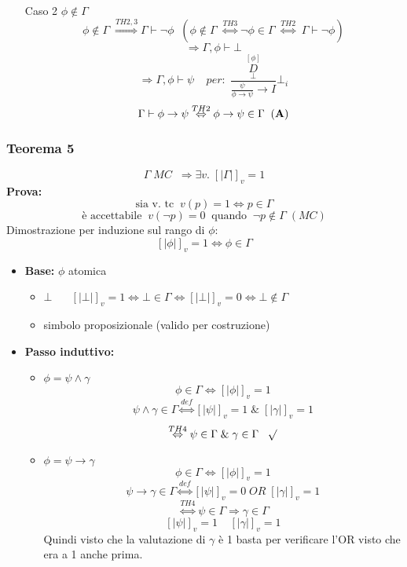 \documentclass{article}
\theoremstyle{break}
\theoremstyle{break}
\theoremstyle{break}
\theoremstyle{break}
\begin{document}
\begin{itemize}
\begin{enumerate}
\begin{enumerate}
          \item [Caso 2] \( \phi \notin \Gamma \) 
            \[
              \phi \notin \Gamma \; \stackrel{TH2,3}{\Rightarrow} \Gamma \vdash \neg \phi\;\; (\phi \notin \Gamma\; \stackrel{TH3}{\Leftrightarrow} \neg \phi \in \Gamma\; \stackrel{TH2}{\Leftrightarrow}\; \Gamma \vdash \neg \phi)
            \]
            \[
            \Rightarrow \Gamma, \phi \vdash \bot
            \] 
            \[
              \Rightarrow \Gamma, \phi \vdash \psi\;\;\;\;per:\; \frac{\underset{\bot}{\stackrel{[\phi]}{D}}}{\frac{\psi}{\phi \to \psi}\to I}\bot_i
            \] 
            \[
              \Gamma \vdash \phi \to \psi \stackrel{TH2}{\Leftrightarrow} \phi \to \psi \in \Gamma\;\;(\text{\textbf{A}})
            \] 
        \end{enumerate}
    \end{enumerate}
\end{itemize}
\subsubsection{Teorema 5}
\[
  \Gamma\;MC\;\; \Rightarrow \exists v.\; [|\Gamma|]_v=1
\] 
\textbf{Prova:}
\[
\text{sia v. tc}\;\; v(p)=1 \Leftrightarrow p \in \Gamma
\] 
\[
\text{è accettabile}\;\;v(\neg p) = 0 \;\;\text{quando}\;\; \neg p \notin \Gamma\;(MC)
\] 
Dimostrazione per induzione sul rango di \( \phi \):
\[
  [|\phi|]_v = 1 \Leftrightarrow \phi \in \Gamma
\] 
\begin{itemize}
  \item \textbf{Base:} \( \phi \) atomica
   \begin{itemize}
     \item \( \bot\;\;\;\;\; \) 
       \(
         [|\bot|]_v = 1 \Leftrightarrow \bot \in \Gamma \Leftrightarrow [|\bot|]_v=0 \Leftrightarrow \bot \notin \Gamma
       \) 
     \item simbolo proposizionale (valido per costruzione)
   \end{itemize} 
  \item \textbf{Passo induttivo:} 
    \begin{itemize}
      \item \( \phi = \psi \wedge \gamma\) 
        \[
          \phi \in \Gamma \Leftrightarrow [|\phi|]_v=1
        \] 
        \[
        \psi \wedge \gamma \in \Gamma \stackrel{def}{\Leftrightarrow} [|\psi|]_v=1\;\&\; [|\gamma|]_v=1
        \] 
        \[
          \stackrel{TH4}{\Leftrightarrow} \psi \in \Gamma\; \& \; \gamma \in \Gamma\;\;\; \surd
        \] 
      \item \( \phi = \psi \to \gamma\)
        \[
        \phi \in \Gamma \Leftrightarrow [|\phi|]_v=1
        \] 
        \[
          \psi \to \gamma \in \Gamma \stackrel{def}{\Leftrightarrow} [|\psi|]_v=0 \; OR\; [|\gamma|]_v=1
        \] 
        \[
          \stackrel{TH4}{\Leftrightarrow} \psi \in \Gamma \Rightarrow \gamma \in \Gamma
        \] 
        \[
          [|\psi|]_v=1\;\;\;\;[|\gamma|]_v=1
        \] 
        Quindi visto che la valutazione di \( \gamma \) è 1 basta per verificare
        l'OR visto che era a 1 anche prima.
    \end{itemize}
\end{itemize}
\end{document}
